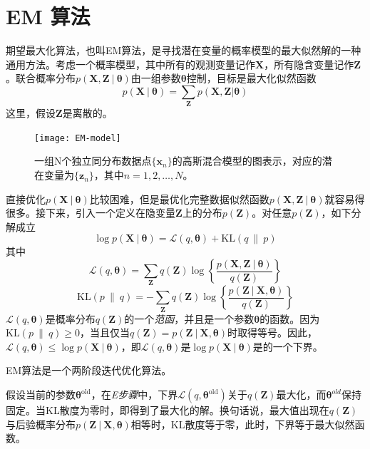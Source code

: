 \documentclass[11pt]{ctexbook}
\begin{document}
\section{EM 算法}
期望最大化算法，也叫EM算法，是寻找潜在变量的概率模型的最大似然解的一种通用方法。考虑一个概率模型，其中所有的观测变量记作$\bm X$，所有隐含变量记作$\bm Z$。联合概率分布$p(\bm X, \bm Z\ |\ \bm \theta)$由一组参数$\bm \theta $控制，目标是最大化似然函数
\begin{equation}
	p(\bm X\ |\ \bm \theta) = \sum_{\bm Z}p(\bm X, \bm Z | \bm \theta)
\end{equation}
这里，假设$\bm Z$是离散的。
\begin{figure}
	\centering
	\texttt{[image: EM-model]}
	\caption{一组N个独立同分布数据点$\{\bm x_n\}$的高斯混合模型的图表示，对应的潜在变量为$\{\bm z_n\}$，其中$n=1,2,\ldots, N$。}
	\label{fig:em-model}
\end{figure}
直接优化$p(\bm X\ |\ \bm\theta)$比较困难，但是最优化完整数据似然函数$p(\bm X, \bm Z\ |\ \bm \theta)$就容易得很多。接下来，引入一个定义在隐变量$\bm Z$上的分布$p(\bm Z)$。对任意$p(\bm Z)$，如下分解成立
\begin{equation}
	\log p(\bm X\ |\ \bm\theta) = \mathcal L(q, \bm \theta) + \mathrm{KL}(q\ \|\ p)
\end{equation}
其中
\begin{equation}
	\mathcal L(q, \bm\theta) = \sum_{\bm Z}q(\bm Z)\log\left\{ \frac{p(\bm X,\bm Z\ |\ \bm \theta)}{q(\bm Z)}\right\}
\end{equation}
\begin{equation}
	\mathrm{KL}(p\ \|\ q) = -\sum_{\bm Z}q(\bm Z)\log\left\{\frac{p(\bm Z\ |\ \bm X, \bm\theta)}{q(\bm Z)}\right\}
\end{equation}
$\mathcal L(q, \bm\theta)$是概率分布$q(\bm Z)$的一个\emph{范函}，并且是一个参数$\bm\theta$的函数。因为$\mathrm{KL}(p\ \|\ q) \geqslant 0$，当且仅当$q(\bm Z) = p(\bm Z\ |\ \bm X, \bm\theta)$时取得等号。因此，$\mathcal L(q, \bm\theta) \leqslant \log p(\bm X\ |\ \bm\theta)$，即$\mathcal L(q, \bm\theta)$是$\log p(\bm X\ |\ \bm\theta)$是的一个下界。

EM算法是一个两阶段迭代优化算法。

假设当前的参数$\bm\theta^{\mathrm{old}}$，在\emph{E步骤}中，下界$\mathcal L(q, \bm\theta^{\mathrm{old}})$关于$q(\bm Z)$最大化，而$\bm\theta^{old}$保持固定。当KL散度为零时，即得到了最大化的解。换句话说，最大值出现在$q(\bm Z)$与后验概率分布$p(\bm Z\ |\ \bm X, \bm\theta)$相等时，KL散度等于零，此时，下界等于最大似然函数。
\end{document}
